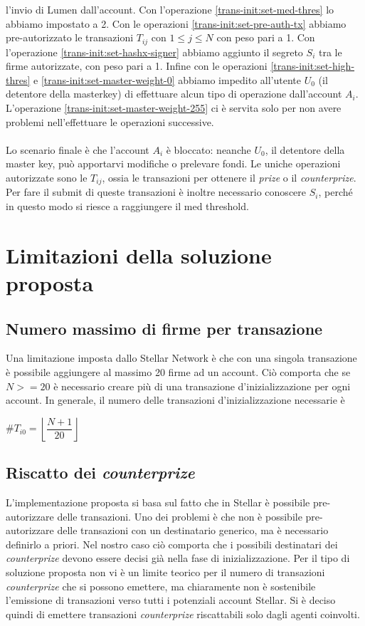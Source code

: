l'invio di Lumen dall'account.
Con l'operazione \ref{trans-init:set-med-thres} lo abbiamo impostato a 2.
Con le operazioni \ref{trans-init:set-pre-auth-tx} abbiamo pre-autorizzato
le transazioni
$ T_{ij} $ con $ 1 \leq j \leq N $ con peso pari a 1.
Con l'operazione \ref{trans-init:set-hashx-signer} abbiamo aggiunto il segreto
$ S_i $ tra le firme autorizzate, con peso pari a 1.
Infine con le operazioni \ref{trans-init:set-high-thres} e
\ref{trans-init:set-master-weight-0} abbiamo impedito all'utente $ U_0 $ (il
detentore della masterkey) di effettuare alcun tipo di operazione dall'account $ A_i $.
L'operazione \ref{trans-init:set-master-weight-255} ci è servita solo per
non avere problemi
nell'effettuare le operazioni successive.
\\
\\
Lo scenario finale è che l'account $ A_i $ è bloccato: neanche $ U_0 $, il detentore
della master key, può apportarvi modifiche o prelevare fondi. Le uniche operazioni
autorizzate sono le $ T_{ij} $, ossia le transazioni per ottenere il \textit{prize}
o il \textit{counterprize}. Per fare il submit di queste transazioni è inoltre
necessario conoscere $ S_i $, perché in questo modo si riesce a raggiungere
il med threshold.

\section{Limitazioni della soluzione proposta}

\subsection{Numero massimo di firme per transazione}
Una limitazione imposta dallo Stellar Network è che con
una singola transazione è possibile aggiungere al massimo 20 firme ad un account.
Ciò comporta che se $ N >= 20 $ è necessario creare più di una transazione
d'inizializzazione per ogni account.
In generale, il numero delle transazioni d'inizializzazione necessarie è
\begin{center}
	$ \# T_{i0} = \left\lfloor\dfrac{ N + 1 }{ 20 }\right\rfloor $
\end{center}

\subsection{Riscatto dei \textit{counterprize}}
L'implementazione proposta si basa sul fatto che in Stellar è possibile pre-autorizzare
delle transazioni. Uno dei problemi è che non è possibile pre-autorizzare delle transazioni con
un destinatario generico, ma è necessario definirlo a priori. Nel nostro caso ciò comporta che
i possibili destinatari dei \textit{counterprize} devono essere decisi già nella
fase di inizializzazione. Per il tipo di soluzione proposta non vi è un limite teorico
per il numero di transazioni \textit{counterprize} che si possono emettere, ma chiaramente
non è sostenibile l'emissione di transazioni verso tutti i potenziali account Stellar.
Si è deciso quindi di emettere transazioni \textit{counterprize} riscattabili solo dagli
agenti coinvolti.


